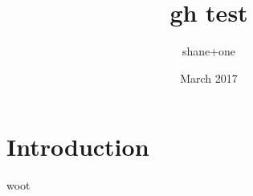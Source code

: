\documentclass{article}
\title{gh test}
\author{shane+one }
\date{March 2017}
\begin{document}
\maketitle

\section{Introduction}


woot
\end{document}
